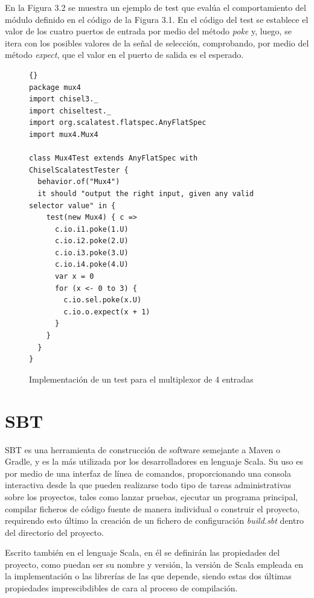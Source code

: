 En la Figura 3.2 se muestra un ejemplo de test que evalúa el comportamiento del módulo definido en el código de la Figura 3.1. En el código del test se establece el valor de los cuatro puertos de entrada por medio del método \textit{poke} y, luego, se itera con los posibles valores de la señal de selección, comprobando, por medio del método \textit{expect}, que el valor en el puerto de salida es el esperado.

\vspace{+0.25cm}
\begin{figure}[h]
\begin{lstlisting}[style=scalaStyle]{}
package mux4
import chisel3._
import chiseltest._
import org.scalatest.flatspec.AnyFlatSpec
import mux4.Mux4

class Mux4Test extends AnyFlatSpec with ChiselScalatestTester {
  behavior.of("Mux4")
  it should "output the right input, given any valid selector value" in {
    test(new Mux4) { c =>
      c.io.i1.poke(1.U)
      c.io.i2.poke(2.U)
      c.io.i3.poke(3.U)
      c.io.i4.poke(4.U)
      var x = 0
      for (x <- 0 to 3) {
        c.io.sel.poke(x.U)
        c.io.o.expect(x + 1)
      }
    }
  }
}
\end{lstlisting}
\vspace{-0.4cm}
\caption{Implementación de un test para el multiplexor de 4 entradas}
\end{figure}


\section{SBT}

SBT es una herramienta de construcción de software semejante a Maven o Gradle, y es la más utilizada por los desarrolladores en lenguaje Scala\cite{scalaSurvey}. Su uso es por medio de una interfaz de línea de comandos, proporcionando una consola interactiva desde la que pueden realizarse todo tipo de tareas administrativas sobre los proyectos, tales como lanzar pruebas, ejecutar un programa principal, compilar ficheros de código fuente de manera individual o construir el proyecto, requirendo esto último la creación de un fichero de configuración \textit{build.sbt} dentro del directorio del proyecto.

Escrito también en el lenguaje Scala, en él se definirán las propiedades del proyecto, como puedan ser su nombre y versión, la versión de Scala empleada en la implementación o las librerías de las que depende, siendo estas dos últimas propiedades imprescibdibles de cara al proceso de compilación.

